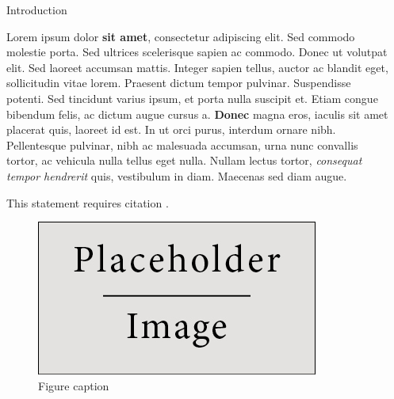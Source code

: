 \documentclass[final]{beamer}
\newlength{\sepwid}
\newlength{\onecolwid}
\begin{document}
\begin{frame}[t]
\begin{columns}[t]
\begin{column}{\onecolwid}
\begin{block}{Introduction}

Lorem ipsum dolor \textbf{sit amet}, consectetur adipiscing elit. Sed commodo molestie porta. Sed ultrices scelerisque sapien ac commodo. Donec ut volutpat elit. Sed laoreet accumsan mattis. Integer sapien tellus, auctor ac blandit eget, sollicitudin vitae lorem. Praesent dictum tempor pulvinar. Suspendisse potenti. Sed tincidunt varius ipsum, et porta nulla suscipit et. Etiam congue bibendum felis, ac dictum augue cursus a. \textbf{Donec} magna eros, iaculis sit amet placerat quis, laoreet id est. In ut orci purus, interdum ornare nibh. Pellentesque pulvinar, nibh ac malesuada accumsan, urna nunc convallis tortor, ac vehicula nulla tellus eget nulla. Nullam lectus tortor, \textit{consequat tempor hendrerit} quis, vestibulum in diam. Maecenas sed diam augue.

This statement requires citation \cite{Smith:2012qr}.

\end{block}


\begin{figure}
\includegraphics[angle=45,width=1.0\linewidth]{placeholder.jpg}
\caption{Figure caption}
\end{figure}


\end{column} %

\begin{column}{\sepwid}\end{column} %


\end{columns}
\end{frame}
\end{document}

